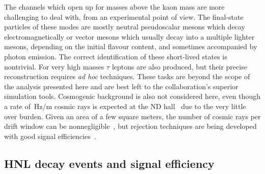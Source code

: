 The channels which open up for masses above the kaon mass are more challenging to deal with, from an experimental point of view.
The final-state particles of these modes are mostly neutral pseudoscalar mesons which decay electromagnetically %
or vector mesons which usually decay into a multiple lighter mesons, depending on the initial flavour content,
and sometimes accompanied by photon emission.
The correct identification of these short-lived states is nontrivial.
For very high masses $\tau$ leptons are also produced, but their precise reconstruction requires \emph{ad hoc} techniques.
These tasks are beyond the scope of the analysis presented here and are best left to the collaboration's superior simulation tools.
Cosmogenic background is also not considered here, even though a rate of \,Hz/m cosmic rays %
is expected at the ND hall~\cite{Abi:2020wmh} due to the very little over burden.
Given an area of a few square meters, the number of cosmic rays per drift window can be nonnegligible~\cite{Abi:2018dnh}, %
but rejection techniques are being developed with good signal efficiencies~\cite{Adams:2018lzd}.
\enlargethispage{\baselineskip}


%
\subsection{HNL decay events and signal efficiency}
\label{sec:numevt}


